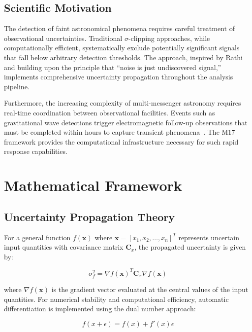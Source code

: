 \documentclass[twocolumn]{article}
\newcommand{\vect}[1]{\boldsymbol{#1}}
\newcommand{\mat}[1]{\boldsymbol{#1}}
\begin{document}
\subsection{Scientific Motivation}

The detection of faint astronomical phenomena requires careful treatment of observational uncertainties. Traditional $\sigma$-clipping approaches, while computationally efficient, systematically exclude potentially significant signals that fall below arbitrary detection thresholds. The approach, inspired by Rathi~\cite{rathi2026} and building upon the principle that ``noise is just undiscovered signal,'' implements comprehensive uncertainty propagation throughout the analysis pipeline.

Furthermore, the increasing complexity of multi-messenger astronomy requires real-time coordination between observational facilities. Events such as gravitational wave detections trigger electromagnetic follow-up observations that must be completed within hours to capture transient phenomena~\cite{ligo2017}. The M17 framework provides the computational infrastructure necessary for such rapid response capabilities.

\section{Mathematical Framework}

\subsection{Uncertainty Propagation Theory}

For a general function $f(\vect{x})$ where $\vect{x} = [x_1, x_2, \ldots, x_n]^T$ represents uncertain input quantities with covariance matrix $\mat{C}_x$, the propagated uncertainty is given by:

\begin{equation}
\sigma_f^2 = \nabla f(\vect{x})^T \mat{C}_x \nabla f(\vect{x})
\label{eq:uncertainty_propagation}
\end{equation}

where $\nabla f(\vect{x})$ is the gradient vector evaluated at the central values of the input quantities. For numerical stability and computational efficiency, automatic differentiation is implemented using the dual number approach:

\begin{equation}
f(x + \epsilon) = f(x) + f'(x)\epsilon
\label{eq:dual_number}
\end{equation}
\end{document}

